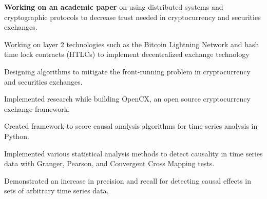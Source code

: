 
\begin{tightemize}
  \item \textbf{Working on an academic paper} on using distributed systems and cryptographic protocols to decrease trust needed in cryptocurrency and securities exchanges.
  \item Working on layer 2 technologies such as the Bitcoin Lightning Network and hash time lock contracts (HTLCs) to implement decentralized exchange technology
  \item Designing algorithms to mitigate the front-running problem in cryptocurrency and securities exchanges.
  \item Implemented research while building OpenCX, an open source cryptocurrency exchange framework.
\end{tightemize}
\subsectionsep

\begin{tightemize}
\item Created framework to score causal analysis algorithms for time series
  analysis in Python.
\item Implemented various statistical analysis methods to detect causality in
  time series data with Granger, Pearson, and Convergent Cross Mapping tests.
\item Demonstrated an increase in precision and recall for detecting causal effects in sets of
  arbitrary time series data.
\end{tightemize}
\subsectionsep

